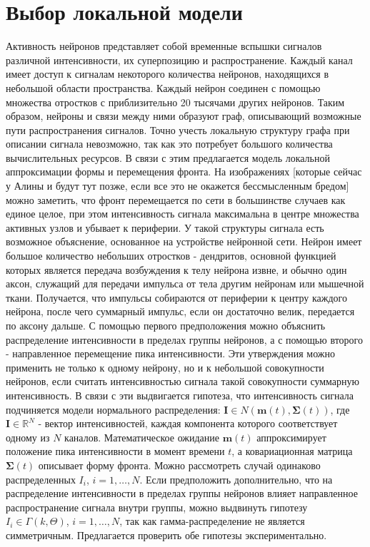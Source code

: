 \documentclass[12pt,twoside]{article}
\begin{document}
\section{Выбор локальной модели}
Активность нейронов представляет собой временные вспышки сигналов различной интенсивности, их суперпозицию и распространение. Каждый канал имеет доступ к сигналам некоторого количества нейронов, находящихся в небольшой области пространства. Каждый нейрон соединен с помощью множества отростков с приблизительно 20 тысячами других нейронов. Таким образом, нейроны и связи между ними образуют граф, описывающий возможные пути распространения сигналов. Точно учесть локальную структуру графа при описании сигнала невозможно, так как это потребует большого количества вычислительных ресурсов. В связи с этим предлагается модель локальной аппроксимации формы и перемещения фронта. На изображениях [которые сейчас у Алины и будут тут позже, если все это не окажется бессмысленным бредом] можно заметить, что фронт перемещается по сети в большинстве случаев как единое целое, при этом интенсивность сигнала максимальна в центре множества активных узлов и убывает к периферии. У такой структуры сигнала есть возможное объяснение, основанное на устройстве нейронной сети. Нейрон имеет большое количество небольших отростков - дендритов, основной функцией которых является передача возбуждения к телу нейрона извне, и обычно один аксон, служащий для передачи импульса от тела другим нейронам или мышечной ткани. Получается, что импульсы собираются от периферии к центру каждого нейрона, после чего суммарный импульс, если он достаточно велик, передается по аксону дальше. С помощью первого предположения можно объяснить распределение интенсивности в пределах группы нейронов, а с помощью второго - направленное перемещение пика интенсивности. Эти утверждения можно применить не только к одному нейрону, но и к небольшой совокупности нейронов, если считать интенсивностью сигнала такой совокупности суммарную интенсивность. В связи с эти выдвигается гипотеза, что интенсивность сигнала подчиняется модели нормального распределения: $\mathbf{I} \in N(\mathbf{m}(t),\mathbf{\Sigma}(t))$, где $\mathbf{I}\in\mathbb{R}^N$ - вектор интенсивностей, каждая компонента которого соответствует одному из $N$ каналов. Математическое ожидание $\mathbf{m}(t)$ аппроксимирует положение пика интенсивности в момент времени $t$, а ковариационная матрица $\mathbf{\Sigma}(t)$ описывает форму фронта. Можно рассмотреть случай одинаково распределенных $I_i$, $i=1,\dots,N$. Если предположить дополнительно, что на распределение интенсивности в пределах группы нейронов влияет направленное распространение сигнала внутри группы, можно выдвинуть гипотезу $I_i \in \Gamma(k, \Theta)$, $i=1,\dots,N$, так как гамма-распределение не является симметричным. Предлагается проверить обе гипотезы экспериментально.


\end{document}
